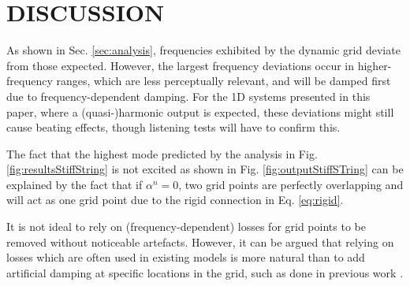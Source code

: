 \documentclass[fleqn]{jaes}
\def\SWcomment[#1]{\textcolor{blue}{#1}}
\begin{document}
 

\section{DISCUSSION}\label{sec:discussion}
As shown in Sec. \ref{sec:analysis}, frequencies exhibited by the dynamic grid deviate from those expected. However, the largest frequency deviations occur in higher-frequency ranges, which are less perceptually relevant, and will be damped first due to frequency-dependent damping. For the 1D systems presented in this paper, where a (quasi-)harmonic output is expected, these deviations might still cause beating effects, though listening tests will have to confirm this.

The fact that the highest mode predicted by the analysis in Fig. \ref{fig:resultsStiffString} is not excited as shown in Fig. \ref{fig:outputStiffSTring} can be explained by the fact that if $\alpha^n = 0$, two grid points are perfectly overlapping and will act as one grid point due to the rigid connection in Eq. \eqref{eq:rigid}. 

It is not ideal to rely on (frequency-dependent) losses for grid points to be removed without noticeable artefacts. However, it can be argued that relying on losses which are often used in existing models is more natural than to add artificial damping at specific locations in the grid, such as done in previous work \cite{Willemsen2021a, Willemsen2021b}. %
\end{document}
